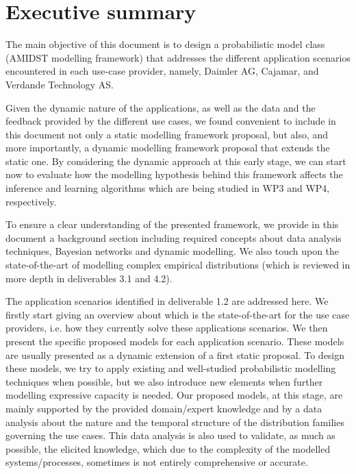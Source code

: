 \section{Executive summary}\label{section:executiveSummary}

The main objective of this document is to design a probabilistic model class (AMIDST modelling framework) that addresses the different application scenarios encountered in each use-case provider, namely, Daimler AG, Cajamar, and Verdande Technology AS.

Given the dynamic nature of the applications, as well as the data and the feedback provided by the different use cases, we found convenient to include in this document not only a static modelling framework proposal, but also, and more importantly, a dynamic modelling framework proposal that extends the static one. By considering the dynamic approach at this early stage, we can start now to evaluate how the modelling hypothesis behind this framework affects the inference and learning algorithms which are being studied in WP3 and WP4, respectively. 

To ensure a clear understanding of the presented framework, we provide in this document a background section including required concepts about data analysis techniques, Bayesian networks and dynamic modelling. We also touch upon the state-of-the-art of modelling complex empirical distributions (which is reviewed in more depth in deliverables 3.1 and 4.2).

The application scenarios identified in deliverable 1.2 are addressed here. We firstly start giving an overview about which is the state-of-the-art for the use case providers, i.e. how they currently solve these applications scenarios. We then present the specific proposed models for each application scenario. These models are usually presented as a dynamic extension of a first static proposal. To design these models, we try to apply existing and well-studied probabilistic modelling techniques when possible, but we also introduce new elements when further modelling expressive capacity is needed. Our proposed models, at this stage, are mainly supported by the provided domain/expert knowledge and by a data analysis about the nature and the temporal structure of the distribution families governing the use cases. This data analysis is also used to validate, as much as possible, the elicited knowledge, which due to the complexity of the modelled systems/processes, sometimes is not entirely comprehensive or accurate.

